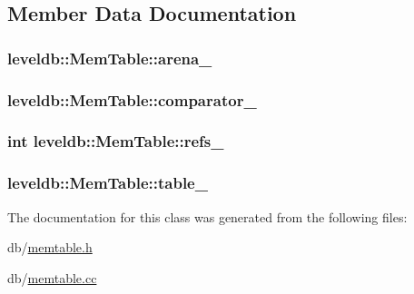 \subsection{Member Data Documentation}
\hypertarget{classleveldb_1_1_mem_table_ad72f453899d3a7532ee9e8156b9c0610}{
\subsubsection[{arena\-\_\-}]{ leveldb\-::\-Mem\-Table\-::arena\-\_\-\hspace{0.3cm}{\ttfamily [private]}}}\label{classleveldb_1_1_mem_table_ad72f453899d3a7532ee9e8156b9c0610}
\hypertarget{classleveldb_1_1_mem_table_ade7c99a1ef260f4d69c3109d87af6c36}{
\subsubsection[{comparator\-\_\-}]{ leveldb\-::\-Mem\-Table\-::comparator\-\_\-\hspace{0.3cm}{\ttfamily [private]}}}\label{classleveldb_1_1_mem_table_ade7c99a1ef260f4d69c3109d87af6c36}
\hypertarget{classleveldb_1_1_mem_table_ac58a2b477ed0df577aa863e7e8619542}{
\subsubsection[{refs\-\_\-}]{\setlength{\rightskip}{0pt plus 5cm}int leveldb\-::\-Mem\-Table\-::refs\-\_\-\hspace{0.3cm}{\ttfamily [private]}}}\label{classleveldb_1_1_mem_table_ac58a2b477ed0df577aa863e7e8619542}
\hypertarget{classleveldb_1_1_mem_table_a9337befab75dc6796fe652a5714db255}{
\subsubsection[{table\-\_\-}]{ leveldb\-::\-Mem\-Table\-::table\-\_\-\hspace{0.3cm}{\ttfamily [private]}}}\label{classleveldb_1_1_mem_table_a9337befab75dc6796fe652a5714db255}


The documentation for this class was generated from the following files\-:\begin{DoxyCompactItemize}
\item 
db/\hyperlink{memtable_8h}{memtable.\-h}\item 
db/\hyperlink{memtable_8cc}{memtable.\-cc}\end{DoxyCompactItemize}
